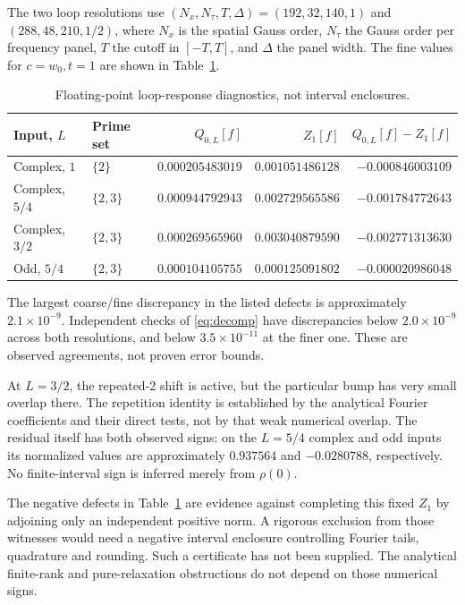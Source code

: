 \documentclass[11pt]{article}
\numberwithin{equation}{section}
\theoremstyle{definition}
\theoremstyle{remark}
\begin{document}
The two loop resolutions use $(N_x,N_\tau,T,\Delta)=(192,32,140,1)$ and $(288,48,210,1/2)$, where $N_x$ is the spatial Gauss order, $N_\tau$ the Gauss order per frequency panel, $T$ the cutoff in $[-T,T]$, and $\Delta$ the panel width. The fine values for $c=w_0,t=1$ are shown in Table~\ref{tab:loops}.
\begin{table}[htbp]
\centering\small
\begin{tabular}{@{}llrrr@{}}
\toprule
Input, $L$ & Prime set & $Q_{0,L}[f]$ & $Z_1[f]$ & $Q_{0,L}[f]-Z_1[f]$\\
\midrule
Complex, $1$ & $\{2\}$ & $0.000205483019$ & $0.001051486128$ & $-0.000846003109$\\
Complex, $5/4$ & $\{2,3\}$ & $0.000944792943$ & $0.002729565586$ & $-0.001784772643$\\
Complex, $3/2$ & $\{2,3\}$ & $0.000269565960$ & $0.003040879590$ & $-0.002771313630$\\
Odd, $5/4$ & $\{2,3\}$ & $0.000104105755$ & $0.000125091802$ & $-0.000020986048$\\
\bottomrule
\end{tabular}
\caption{Floating-point loop-response diagnostics, not interval enclosures.}
\label{tab:loops}
\end{table}
The largest coarse/fine discrepancy in the listed defects is approximately $2.1\times10^{-9}$. Independent checks of \eqref{eq:decomp} have discrepancies below $2.0\times10^{-9}$ across both resolutions, and below $3.5\times10^{-11}$ at the finer one. These are observed agreements, not proven error bounds.

At $L=3/2$, the repeated-2 shift is active, but the particular bump has very small overlap there. The repetition identity is established by the analytical Fourier coefficients and their direct tests, not by that weak numerical overlap. The residual itself has both observed signs: on the $L=5/4$ complex and odd inputs its normalized values are approximately $0.937564$ and $-0.0280788$, respectively. No finite-interval sign is inferred merely from $\rho(0)$.

The negative defects in Table~\ref{tab:loops} are evidence against completing this fixed $Z_1$ by adjoining only an independent positive norm. A rigorous exclusion from those witnesses would need a negative interval enclosure controlling Fourier tails, quadrature and rounding. Such a certificate has not been supplied. The analytical finite-rank and pure-relaxation obstructions do not depend on those numerical signs.
\end{document}
